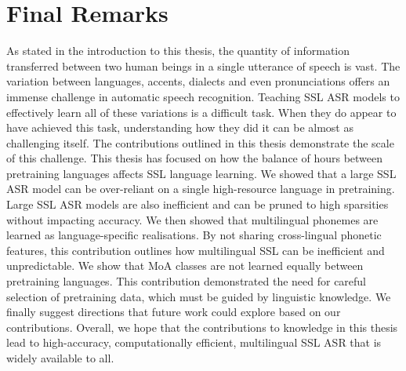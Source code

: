\section{Final Remarks}\label{conc_sec:final_remark}
As stated in the introduction to this thesis, the quantity of information transferred between two human beings in a single utterance of speech is vast. The variation between languages, accents, dialects and even pronunciations offers an immense challenge in automatic speech recognition. Teaching SSL ASR models to effectively learn all of these variations is a difficult task. When they do appear to have achieved this task, understanding how they did it can be almost as challenging itself. The contributions outlined in this thesis demonstrate the scale of this challenge. This thesis has focused on how the balance of hours between pretraining languages affects SSL language learning. We showed that a large SSL ASR model can be over-reliant on a single high-resource language in pretraining. Large SSL ASR models are also inefficient and can be pruned to high sparsities without impacting accuracy. We then showed that multilingual phonemes are learned as language-specific realisations. By not sharing cross-lingual phonetic features, this contribution outlines how multilingual SSL can be inefficient and unpredictable. We show that MoA classes are not learned equally between pretraining languages. This contribution demonstrated the need for careful selection of pretraining data, which must be guided by linguistic knowledge. We finally suggest directions that future work could explore based on our contributions. Overall, we hope that the contributions to knowledge in this thesis lead to high-accuracy, computationally efficient, multilingual SSL ASR that is widely available to all.